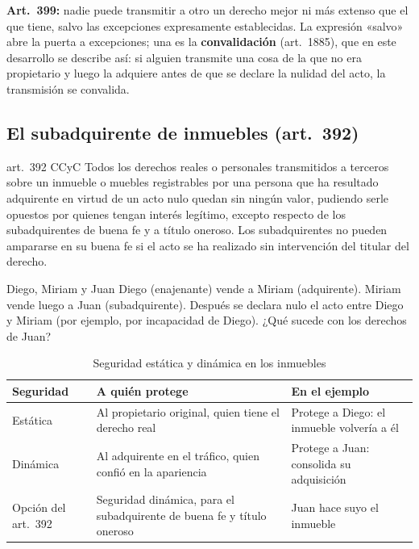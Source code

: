\documentclass[12pt,oneside]{book}
\begin{document}
\textbf{Art.~399:} nadie puede transmitir a otro un derecho mejor ni más extenso que el que tiene, salvo las excepciones expresamente establecidas. La expresión «salvo» abre la puerta a excepciones; una es la \textbf{convalidación} (art.~1885), que en este desarrollo se describe así: si alguien transmite una cosa de la que no era propietario y luego la adquiere antes de que se declare la nulidad del acto, la transmisión se convalida. %

\subsection{El subadquirente de inmuebles (art.~392)}

\begin{regla}{art.~392 CCyC}
Todos los derechos reales o personales transmitidos a terceros sobre un inmueble o muebles registrables por una persona que ha resultado adquirente en virtud de un acto nulo quedan sin ningún valor, pudiendo serle opuestos por quienes tengan interés legítimo, excepto respecto de los subadquirentes de buena fe y a título oneroso. Los subadquirentes no pueden ampararse en su buena fe si el acto se ha realizado sin intervención del titular del derecho.
\end{regla}

\begin{ejemplo}{Diego, Miriam y Juan}
Diego (enajenante) vende a Miriam (adquirente). Miriam vende luego a Juan (subadquirente). Después se declara nulo el acto entre Diego y Miriam (por ejemplo, por incapacidad de Diego). ¿Qué sucede con los derechos de Juan?
\end{ejemplo}

\begin{table}[H]
\centering
\small
\begin{tabularx}{\textwidth}{>{\raggedright\arraybackslash}p{}>{\raggedright\arraybackslash}X>{\raggedright\arraybackslash}X}
\toprule
\textbf{Seguridad} & \textbf{A quién protege} & \textbf{En el ejemplo} \\
\midrule
Estática & Al propietario original, quien tiene el derecho real & Protege a Diego: el inmueble volvería a él \\
Dinámica & Al adquirente en el tráfico, quien confió en la apariencia & Protege a Juan: consolida su adquisición \\
Opción del art.~392 & Seguridad dinámica, para el subadquirente de buena fe y título oneroso & Juan hace suyo el inmueble \\
\bottomrule
\end{tabularx}
\caption{Seguridad estática y dinámica en los inmuebles}
\end{table}
\end{document}

